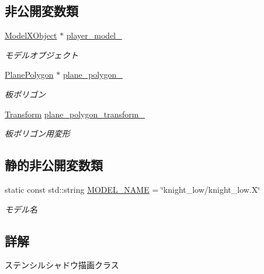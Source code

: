 \subsection*{非公開変数類}
\begin{DoxyCompactItemize}
\item 
\mbox{\hyperlink{class_model_x_object}{Model\+X\+Object}} $\ast$ \mbox{\hyperlink{class_stencil_shadow_test_draw_a6c57baf28efdf89dbfb52fb379f33c26}{player\+\_\+model\+\_\+}}
\begin{DoxyCompactList}\small\item\em モデルオブジェクト \end{DoxyCompactList}\item 
\mbox{\hyperlink{class_plane_polygon}{Plane\+Polygon}} $\ast$ \mbox{\hyperlink{class_stencil_shadow_test_draw_ae2abfaec1e669ea0019e67d02e2942b6}{plane\+\_\+polygon\+\_\+}}
\begin{DoxyCompactList}\small\item\em 板ポリゴン \end{DoxyCompactList}\item 
\mbox{\hyperlink{class_transform}{Transform}} \mbox{\hyperlink{class_stencil_shadow_test_draw_ae64a0179736364fd9e6d26074edcf61a}{plane\+\_\+polygon\+\_\+transform\+\_\+}}
\begin{DoxyCompactList}\small\item\em 板ポリゴン用変形 \end{DoxyCompactList}\end{DoxyCompactItemize}
\subsection*{静的非公開変数類}
\begin{DoxyCompactItemize}
\item 
static const std\+::string \mbox{\hyperlink{class_stencil_shadow_test_draw_a1ef49214f41a9fa1f3c2a7616eaf5655}{M\+O\+D\+E\+L\+\_\+\+N\+A\+ME}} = \char`\"{}knight\+\_\+low/knight\+\_\+low.\+X\char`\"{}
\begin{DoxyCompactList}\small\item\em モデル名 \end{DoxyCompactList}\end{DoxyCompactItemize}


\subsection{詳解}
ステンシルシャドウ描画クラス 

